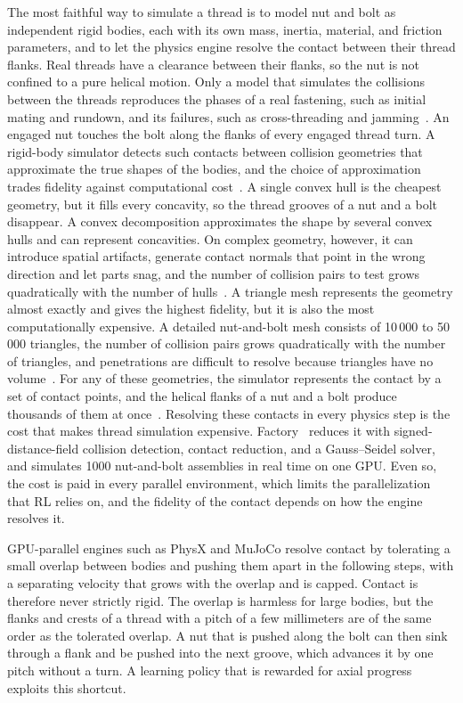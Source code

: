 The most faithful way to simulate a thread is to model nut and bolt as independent rigid bodies, each with its own mass, inertia, material, and friction parameters, and to let the physics engine resolve the contact between their thread flanks. Real threads have a clearance between their flanks, so the nut is not confined to a pure helical motion. Only a model that simulates the collisions between the threads reproduces the phases of a real fastening, such as initial mating and rundown, and its failures, such as cross-threading and jamming~\cite{Narang2022}. An engaged nut touches the bolt along the flanks of every engaged thread turn. A rigid-body simulator detects such contacts between collision geometries that approximate the true shapes of the bodies, and the choice of approximation trades fidelity against computational cost~\cite{Narang2022}. A single convex hull is the cheapest geometry, but it fills every concavity, so the thread grooves of a nut and a bolt disappear. A convex decomposition approximates the shape by several convex hulls and can represent concavities. On complex geometry, however, it can introduce spatial artifacts, generate contact normals that point in the wrong direction and let parts snag, and the number of collision pairs to test grows quadratically with the number of hulls~\cite{Narang2022}. A triangle mesh represents the geometry almost exactly and gives the highest fidelity, but it is also the most computationally expensive. A detailed nut-and-bolt mesh consists of 10\,000 to 50\,000 triangles, the number of collision pairs grows quadratically with the number of triangles, and penetrations are difficult to resolve because triangles have no volume~\cite{Narang2022}. For any of these geometries, the simulator represents the contact by a set of contact points, and the helical flanks of a nut and a bolt produce thousands of them at once~\cite{Narang2022}. Resolving these contacts in every physics step is the cost that makes thread simulation expensive. Factory~\cite{Narang2022} reduces it with signed-distance-field collision detection, contact reduction, and a Gauss--Seidel solver, and simulates 1000 nut-and-bolt assemblies in real time on one GPU. Even so, the cost is paid in every parallel environment, which limits the parallelization that \ac{RL} relies on, and the fidelity of the contact depends on how the engine resolves it.

GPU-parallel engines such as PhysX and MuJoCo resolve contact by tolerating a small overlap between bodies and pushing them apart in the following steps, with a separating velocity that grows with the overlap and is capped.
Contact is therefore never strictly rigid. The overlap is harmless for large bodies, but the flanks and crests of a thread with a pitch of a few millimeters are of the same order as the tolerated overlap. A nut that is pushed along the bolt can then sink through a flank and be pushed into the next groove, which advances it by one pitch without a turn. A learning policy that is rewarded for axial progress exploits this shortcut.

